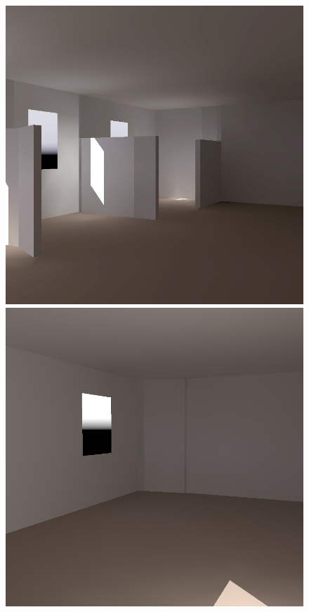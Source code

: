 \begin{figure}[t]
\includegraphics[width=\figwidth]{p3r_N6_march_chris.png} \hfill
\includegraphics[width=\figwidth]{p3r_042_camera_chris_december}    %

\end{figure}
